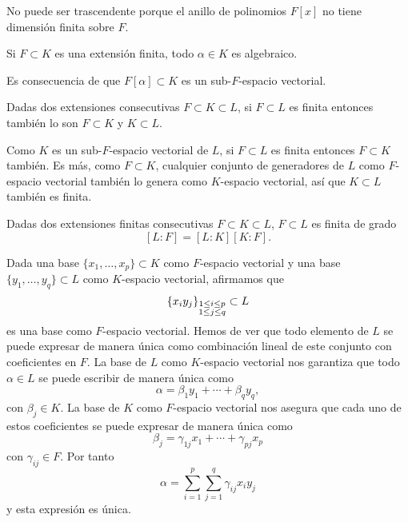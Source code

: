 
No puede ser trascendente porque el anillo de polinomios \(F[x]\) no
tiene dimensión finita sobre \(F\).\\


Si \(F\subset K\) es una extensión finita, todo \(\alpha\in K\) es
algebraico. 


Es consecuencia de que \(F[\alpha]\subset K\) es un sub-\(F\)-espacio
vectorial.\\


Dadas dos extensiones consecutivas \(F\subset K\subset L\), si
\(F\subset L\) es finita entonces también lo son \(F\subset K\) y
\(K\subset L\). 


Como \(K\) es un sub-\(F\)-espacio vectorial de \(L\), si \(F\subset L\)
es finita entonces \(F\subset K\) también. Es más, como \(F\subset K\),
cualquier conjunto de generadores de \(L\) como \(F\)-espacio vectorial
también lo genera como \(K\)-espacio vectorial, así que \(K\subset L\)
también es finita.\\


Dadas dos extensiones finitas consecutivas \(F\subset K\subset L\),
\(F\subset L\) es finita de grado \[[L:F]=[L:K][K:F].\]


Dada una base \(\{x_1,\dots, x_p\}\subset K\) como \(F\)-espacio
vectorial y una base \(\{y_1,\dots, y_q\}\subset L\) como
\(K\)-espacio vectorial, afirmamos que
\[\{x_iy_j\}_{\substack{1\leq i\leq p\cr 1\leq j\leq q}}\subset L\]
es una base como \(F\)-espacio vectorial. Hemos de ver que todo elemento
de \(L\) se puede expresar de manera única como combinación lineal de
este conjunto con coeficientes en \(F\). La base de \(L\) como
\(K\)-espacio vectorial nos garantiza que todo \(\alpha\in L\) se puede
escribir de manera única como
\[\alpha=\beta_1y_1+\cdots+\beta_qy_q,\] con \(\beta_j\in K\). La
base de \(K\) como \(F\)-espacio vectorial nos asegura que cada uno de
estos coeficientes se puede expresar de manera única como
\[\beta_j=\gamma_{1j}x_1+\cdots+\gamma_{pj}x_p\] con
\(\gamma_{ij}\in F\). Por tanto
\[\alpha=\sum_{i=1}^p\sum_{j=1}^q\gamma_{ij}x_iy_j\] y esta
expresión es única.\\

